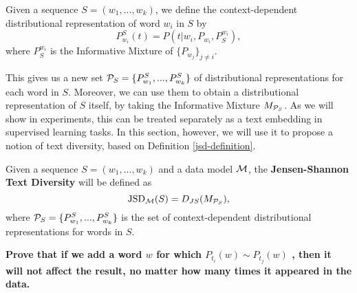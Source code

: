 \bed
Given a sequence $S=(w_1,...,w_k)$, we define the context-dependent
distributional representation of word $w_i$ in $S$ by 
\[P_{w_i}^S(t) = P(t|w_i,P_{w_i},P_S^{w_i}),\]
where $P_S^{w_i}$ is the Informative Mixture of $\{P_{w_j}\}_{j\neq i}$.
\eed

This gives us a new set ${\mathcal P}_S=\{P_{w_1}^S,...,P_{w_k}^S\}$ of
distributional representations for each word in $S$. Moreover, we can
use them to obtain a distributional representation of $S$ itself, by
taking the Informative Mixture $M_{{\mathcal P}_S}$. As we will show in
experiments, this can be treated separately as a text embedding in
supervised learning tasks. In this section, however, we will use it to
propose a notion of text diversity, based on Definition
\ref{jsd-definition}. 

\bed
Given a sequence $S=(w_1,...,w_k)$ and a data model ${\mathcal M}$, the
{\bf Jensen-Shannon Text Diversity} will be defined as
\[\textrm{JSD}_{{\mathcal M}}(S) = D_{JS}(M_{{\mathcal P}_S}),\] where ${\mathcal P}_S=\{P_{w_1}^S,...,P_{w_k}^S\}$ is the set
of context-dependent distributional representations for words in $S$. 
\eed



{\bf Prove that if we add a word $w$ for which $P_{t_i}(w)\sim P_{t_j}(w)$ , then it will not affect the result, no matter how many times it appeared in the data.} 





